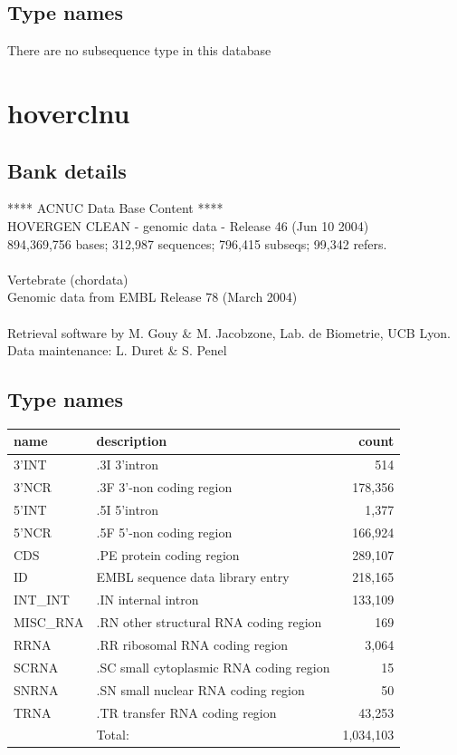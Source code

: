 \documentclass{article}
\begin{document}
\begin{Schunk}
\subsection{Type names}
There are no subsequence type in this database
\section{ hoverclnu }
\subsection{Bank details}
               ****     ACNUC Data Base Content      ****                      \\
         HOVERGEN CLEAN - genomic data - Release 46 (Jun 10 2004)\\
894,369,756 bases; 312,987 sequences; 796,415 subseqs; 99,342 refers.\\
                                                                               \\
                       Vertebrate (chordata)\\
             Genomic data from EMBL Release 78  (March 2004)\\
\\
Retrieval software by M. Gouy \& M. Jacobzone, Lab. de Biometrie, UCB Lyon.\\
Data maintenance: L. Duret \& S. Penel\\


\subsection{Type names}
\noindent\begin{tabular}{llr}
\hline \hline
name & description & count \\
\hline
3'INT  &  .3I 3'intron  &  514 \\
3'NCR  &  .3F  3'-non coding region  &  178,356 \\
5'INT  &  .5I 5'intron  &  1,377 \\
5'NCR  &  .5F  5'-non coding region  &  166,924 \\
CDS  &  .PE protein coding region  &  289,107 \\
ID  &  EMBL sequence data library entry  &  218,165 \\
INT\_INT  &  .IN  internal intron  &  133,109 \\
MISC\_RNA  &  .RN other structural RNA coding region  &  169 \\
RRNA  &  .RR ribosomal RNA coding region  &  3,064 \\
SCRNA  &  .SC small cytoplasmic RNA coding region  &  15 \\
SNRNA  &  .SN small nuclear RNA coding region  &  50 \\
TRNA  &  .TR transfer RNA coding region  &  43,253 \\
\hline
 & Total: & 1,034,103 \\
\hline \hline
\end{tabular}


\end{Schunk}
\end{document}
